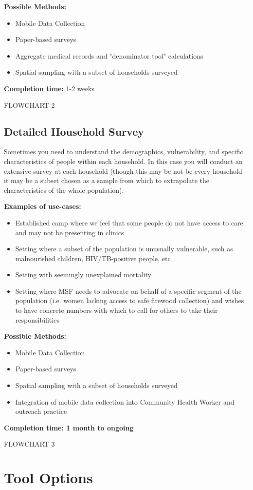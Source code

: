 \documentclass[a4paper,12pt,twoside]{article}
\begin{document}
\noindent
\textbf{Possible Methods:}
\begin{itemize}
    \item Mobile Data Collection
    \item Paper-based surveys
    \item Aggregate medical records and "denominator tool" calculations
    \item Spatial sampling with a subset of households surveyed
\end{itemize}

\noindent
\textbf{Completion time:} 1-2 weeks

FLOWCHART 2
\subsection{Detailed Household Survey}
Sometimes you need to understand the demographics, vulnerability, and specific characteristics of people within each household. In this case you will conduct an extensive survey at each household (though this may be not be every household---it may be a subset chosen as a sample from which to extrapolate the characteristics of the whole population). 



\noindent
\textbf{Examples of use-cases:}
\begin{itemize}
    \item Established camp where we feel that some people do not have access to care and may not be presenting in clinics
    \item Setting where a subset of the population is unusually vulnerable, such as malnourished children, HIV/TB-positive people, etc
    \item Setting with seemingly unexplained mortality
    \item Setting where MSF needs to advocate on behalf of a specific segment of the population (i.e. women lacking access to safe firewood collection) and wishes to have concrete numbers with which to call for others to take their responsibilities
\end{itemize}

\noindent
\textbf{Possible Methods:}
\begin{itemize}
    \item Mobile Data Collection
    \item Paper-based surveys
    \item Spatial sampling with a subset of households surveyed
    \item Integration of mobile data collection into Community Health Worker and outreach practice
\end{itemize}

\noindent
\textbf{Completion time: 1 month to ongoing}

FLOWCHART 3

\section{Tool Options}
\end{document}
